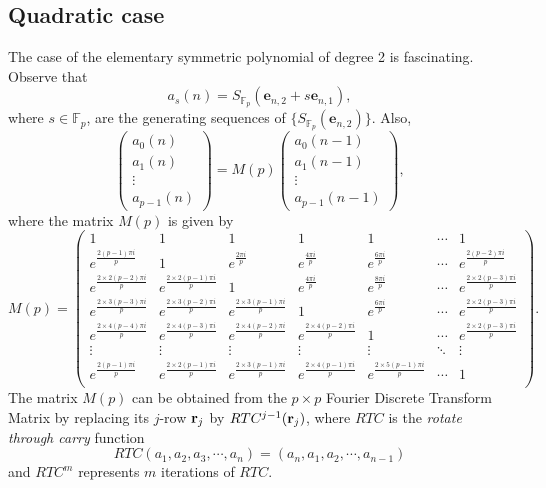 \subsection{Quadratic case}
The case of the elementary symmetric polynomial of degree 2 is fascinating.  Observe that
 \begin{equation}
  a_{s}(n) = S_{\mathbb{F}_p}(\boldsymbol{e}_{n,2}+s\boldsymbol{e}_{n,1}),
 \end{equation}
where $s\in \mathbb{F}_p$, are the generating sequences of $\{S_{\mathbb{F}_p}(\boldsymbol{e}_{n,2})\}$.  Also,
\begin{equation}
\left( \begin{array}{c}
  a_0(n)\\
  a_1(n)\\
  \vdots\\
  a_{p-1}(n)
 \end{array}
\right) = M(p) \left( \begin{array}{c}
  a_0(n-1)\\
  a_1(n-1)\\
  \vdots\\
  a_{p-1}(n-1)
 \end{array}
\right),
\end{equation}
where the matrix $M(p)$ is given by
\begin{equation}
M(p)=\left(\begin{array}{ccccccc}
1 & 1 & 1 & 1& 1 & \cdots & 1 \\
e^{\frac{2(p-1)\pi i}{p}} & 1 & e^{\frac{2 \pi i}{p}} & e^{\frac{4 \pi i}{p}} & e^{\frac{6 \pi i}{p}}& \cdots & e^{\frac{2(p-2)\pi i}{p}}\\
e^{\frac{2\times 2(p-2)\pi i}{p}}& e^{\frac{2\times 2(p-1)\pi i}{p}} & 1 & e^{\frac{4  \pi i}{p}} & e^{\frac{8 \pi i}{p}}& \cdots & e^{\frac{2\times 2(p-3)\pi i}{p}} \\
e^{\frac{2\times 3(p-3)\pi i}{p}}& e^{\frac{2\times 3(p-2)\pi i}{p}} & e^{\frac{2\times 3(p-1)\pi i}{p}} & 1 & e^{\frac{6  \pi i}{p}} &  \cdots & e^{\frac{2\times 2(p-3)\pi i}{p}} \\
e^{\frac{2\times 4(p-4)\pi i}{p}}& e^{\frac{2\times 4(p-3)\pi i}{p}} & e^{\frac{2\times 4(p-2)\pi i}{p}} & e^{\frac{2\times 4(p-2)\pi i}{p}} &  1 &   \cdots & e^{\frac{2\times 2(p-3)\pi i}{p}} \\
 \vdots& \vdots& \vdots & \vdots & \vdots& \ddots & \vdots \\
e^{\frac{2(p-1) \pi i}{p}} & e^{\frac{2\times 2(p-1) \pi i}{p}}  & e^{\frac{2\times 3(p-1) \pi i}{p}} & e^{\frac{2\times 4(p-1) \pi i}{p}} & e^{\frac{2\times 5 (p-1)\pi i}{p}}  & \cdots & 1 \\
 \end{array}\right).
\end{equation}
The matrix $M(p)$ can be obtained from the $p\times p$ Fourier Discrete Transform Matrix by replacing its $j$-row ${\bf r}_j$ by $RTC^{j-1}({\bf r}_j)$, where $RTC$ is the {\it rotate through carry}
function
\begin{equation}
 RTC(a_1,a_2,a_3,\cdots, a_n) = (a_n,a_1,a_2,\cdots, a_{n-1})
\end{equation}
and $RTC^m$ represents $m$ iterations of $RTC$.


